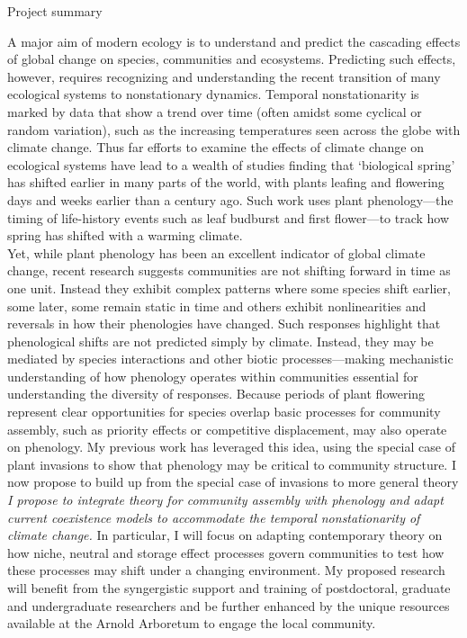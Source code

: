 \documentclass[12pt,a4paper,oneside]{article}
\begin{document}
\begin{center}
{\sc Project summary} %
\end{center}
\vspace{-1ex}
A major aim of modern ecology is to understand and predict the cascading effects of global change on species, communities and ecosystems. Predicting such effects, however, requires recognizing and understanding the recent transition of many ecological systems to nonstationary dynamics. Temporal nonstationarity is marked by data that show a trend over time (often amidst some cyclical or random variation), such as the increasing temperatures seen across the globe with climate change. Thus far efforts to examine the effects of climate change on ecological systems have lead to a wealth of studies finding that `biological spring' has shifted earlier in many parts of the world, with plants leafing and flowering days and weeks earlier than a century ago. Such work uses plant phenology---the timing of life-history events such as leaf budburst and first flower---to track how spring has shifted with a warming climate.
\vspace{1.5ex}\\
Yet, while plant phenology has been an excellent indicator of global climate change, recent research suggests communities are not shifting forward in time as one unit. Instead they exhibit complex patterns where some species shift earlier, some later, some remain static in time and others exhibit nonlinearities and reversals in how their phenologies have changed. Such responses highlight that phenological shifts are not predicted simply by climate. Instead, they may be mediated by species interactions and other biotic processes---making mechanistic understanding of how phenology operates within communities essential for understanding the diversity of responses. Because periods of plant flowering represent clear opportunities for species overlap basic processes for community assembly, such as priority effects or competitive displacement, may also operate on phenology. My previous work has leveraged this idea, using the special case of plant invasions to show that phenology may be critical to community structure. I now propose to build up from the special case of invasions to more general theory
\vspace{1.5ex}\\
\emph{I propose to integrate theory for community assembly with phenology and adapt current coexistence models to accommodate the temporal nonstationarity of climate change.} In particular, I will focus on adapting contemporary theory on how niche, neutral and storage effect processes govern communities to test how these processes may shift under a changing environment. My proposed research will benefit from the syngergistic support and training of postdoctoral, graduate and undergraduate researchers and be further enhanced by the unique resources available at the Arnold Arboretum to engage the local community.
\end{document}
